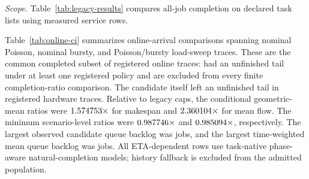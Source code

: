 \documentclass[opre,dblanonrev]{informs4}
\begin{document}
\begin{table}[t]
\end{table}

\emph{Scope.}  Table~\ref{tab:legacy-results} compares all-job completion on
declared task lists using measured service rows.

Table~\ref{tab:online-ci} summarizes \UnifiedOnlineComparisonCount{}
online-arrival comparisons spanning nominal Poisson, nominal bursty, and
Poisson/bursty load-sweep traces.  These are the common completed subset of
\UnifiedRegisteredOnlineTraceCount{} registered online traces:
\UnifiedExcludedIncompleteOnlineTraceCount{} had an unfinished tail under at
least one registered policy and are excluded from every finite completion-ratio
comparison.  The candidate itself left an unfinished tail in
\UnifiedIncompleteOursRunCount{} registered hardware traces.  Relative to legacy
caps, the conditional geometric-mean ratios were \(1.574753\times\) for makespan and
\(2.360104\times\) for mean flow.  The minimum
scenario-level ratios were \(0.987746\times\) and
\(0.985094\times\), respectively.  The largest
observed candidate queue backlog was \UnifiedQueueMaxBacklogMax{} jobs, and the
largest time-weighted mean queue backlog was
\UnifiedQueueMeanBacklogMax{} jobs.  All ETA-dependent rows use task-native
phase-aware natural-completion models; history fallback is excluded from the
admitted population.
\end{document}

